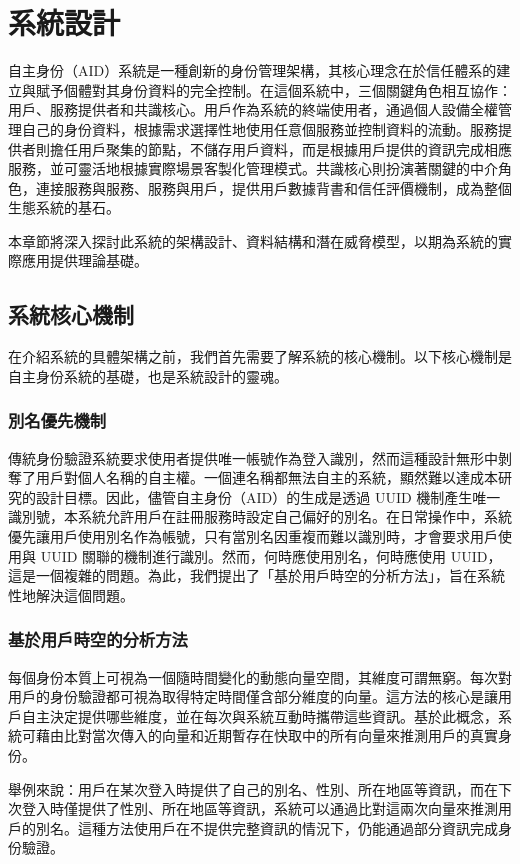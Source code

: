 
\chapter{系統設計}
自主身份（AID）系統是一種創新的身份管理架構，其核心理念在於信任體系的建立與賦予個體對其身份資料的完全控制。在這個系統中，三個關鍵角色相互協作：用戶、服務提供者和共識核心。用戶作為系統的終端使用者，通過個人設備全權管理自己的身份資料，根據需求選擇性地使用任意個服務並控制資料的流動。服務提供者則擔任用戶聚集的節點，不儲存用戶資料，而是根據用戶提供的資訊完成相應服務，並可靈活地根據實際場景客製化管理模式。共識核心則扮演著關鍵的中介角色，連接服務與服務、服務與用戶，提供用戶數據背書和信任評價機制，成為整個生態系統的基石。

本章節將深入探討此系統的架構設計、資料結構和潛在威脅模型，以期為系統的實際應用提供理論基礎。
\section{系統核心機制}
在介紹系統的具體架構之前，我們首先需要了解系統的核心機制。以下核心機制是自主身份系統的基礎，也是系統設計的靈魂。
\subsection{別名優先機制}
傳統身份驗證系統要求使用者提供唯一帳號作為登入識別，然而這種設計無形中剝奪了用戶對個人名稱的自主權。一個連名稱都無法自主的系統，顯然難以達成本研究的設計目標。因此，儘管自主身份（AID）的生成是透過 UUID 機制\cite{uuid}產生唯一識別號，本系統允許用戶在註冊服務時設定自己偏好的別名。在日常操作中，系統優先讓用戶使用別名作為帳號，只有當別名因重複而難以識別時，才會要求用戶使用與 UUID 關聯的機制進行識別。然而，何時應使用別名，何時應使用 UUID，這是一個複雜的問題。為此，我們提出了「基於用戶時空的分析方法」，旨在系統性地解決這個問題。
\subsection{基於用戶時空的分析方法}
每個身份本質上可視為一個隨時間變化的動態向量空間，其維度可謂無窮。每次對用戶的身份驗證都可視為取得特定時間僅含部分維度的向量。這方法的核心是讓用戶自主決定提供哪些維度，並在每次與系統互動時攜帶這些資訊。基於此概念，系統可藉由比對當次傳入的向量和近期暫存在快取中的所有向量來推測用戶的真實身份。

舉例來說：用戶在某次登入時提供了自己的別名、性別、所在地區等資訊，而在下次登入時僅提供了性別、所在地區等資訊，系統可以通過比對這兩次向量來推測用戶的別名。這種方法使用戶在不提供完整資訊的情況下，仍能通過部分資訊完成身份驗證。

